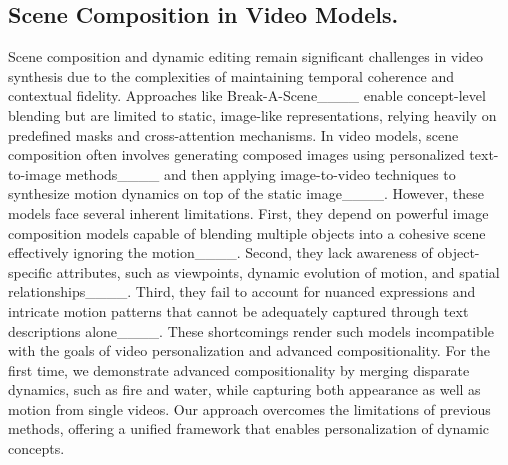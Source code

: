 \subsection{Scene Composition in Video Models.}
Scene composition and dynamic editing remain significant challenges in video synthesis due to the complexities of maintaining temporal coherence and contextual fidelity.
Approaches like Break-A-Scene____ enable concept-level blending but are limited to static, image-like representations, relying heavily on predefined masks and cross-attention mechanisms.
In video models, scene composition often involves generating composed images using personalized text-to-image methods____ and then applying image-to-video techniques to synthesize motion dynamics on top of the static image____.
However, these models face several inherent limitations. First, they depend on powerful image composition models capable of blending multiple objects into a cohesive scene effectively ignoring the motion____. Second, they lack awareness of object-specific attributes, such as viewpoints, dynamic evolution of motion, and spatial relationships____.
Third, they fail to account for nuanced expressions and intricate motion patterns that cannot be adequately captured through text descriptions alone____.
These shortcomings render such models incompatible with the goals of video personalization and advanced compositionality.
For the first time, we demonstrate advanced compositionality by merging disparate dynamics, such as fire and water, while capturing both appearance as well as motion from single videos.
Our approach overcomes the limitations of previous methods, offering a unified framework that enables personalization of dynamic concepts.